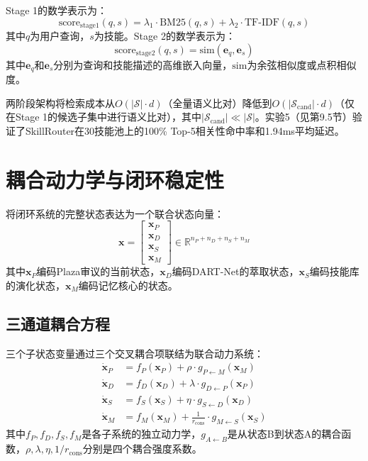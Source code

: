 \documentclass[12pt,a4paper]{ctexart}
\begin{document}
Stage 1的数学表示为：
\begin{equation}
\text{score}_{\text{stage1}}(q, s) = \lambda_1 \cdot \text{BM25}(q, s) + \lambda_2 \cdot \text{TF-IDF}(q, s)
\label{eq:stage1}
\end{equation}
其中$q$为用户查询，$s$为技能。Stage 2的数学表示为：
\begin{equation}
\text{score}_{\text{stage2}}(q, s) = \text{sim}(\mathbf{e}_q, \mathbf{e}_s)
\label{eq:stage2}
\end{equation}
其中$\mathbf{e}_q$和$\mathbf{e}_s$分别为查询和技能描述的高维嵌入向量，$\text{sim}$为余弦相似度或点积相似度。

两阶段架构将检索成本从$O(|\mathcal{S}| \cdot d)$（全量语义比对）降低到$O(|\mathcal{S}_{\text{cand}}| \cdot d)$（仅在Stage 1的候选子集中进行语义比对），其中$|\mathcal{S}_{\text{cand}}| \ll |\mathcal{S}|$。实验5（见第9.5节）验证了SkillRouter在30技能池上的100\% Top-5相关性命中率和1.94ms平均延迟。

\section{耦合动力学与闭环稳定性}

将闭环系统的完整状态表达为一个联合状态向量：
\begin{equation}
\mathbf{x} = \begin{bmatrix}
\mathbf{x}_P \\ \mathbf{x}_D \\ \mathbf{x}_S \\ \mathbf{x}_M
\end{bmatrix} \in \mathbb{R}^{n_P + n_D + n_S + n_M}
\label{eq:unified_state}
\end{equation}
其中$\mathbf{x}_P$编码Plaza审议的当前状态，$\mathbf{x}_D$编码DART-Net的萃取状态，$\mathbf{x}_S$编码技能库的演化状态，$\mathbf{x}_M$编码记忆核心的状态。

\subsection{三通道耦合方程}

三个子状态变量通过三个交叉耦合项联结为联合动力系统：
\begin{align}
\dot{\mathbf{x}}_P &= f_P(\mathbf{x}_P) + \rho \cdot g_{P \leftarrow M}(\mathbf{x}_M) \label{eq:dot_P} \\
\dot{\mathbf{x}}_D &= f_D(\mathbf{x}_D) + \lambda \cdot g_{D \leftarrow P}(\mathbf{x}_P) \label{eq:dot_D} \\
\dot{\mathbf{x}}_S &= f_S(\mathbf{x}_S) + \eta \cdot g_{S \leftarrow D}(\mathbf{x}_D) \label{eq:dot_S} \\
\dot{\mathbf{x}}_M &= f_M(\mathbf{x}_M) + \frac{1}{r_{\text{cons}}} \cdot g_{M \leftarrow S}(\mathbf{x}_S) \label{eq:dot_M}
\end{align}
其中$f_P, f_D, f_S, f_M$是各子系统的独立动力学，$g_{A \leftarrow B}$是从状态B到状态A的耦合函数，$\rho, \lambda, \eta, 1/r_{\text{cons}}$分别是四个耦合强度系数。
\end{document}
